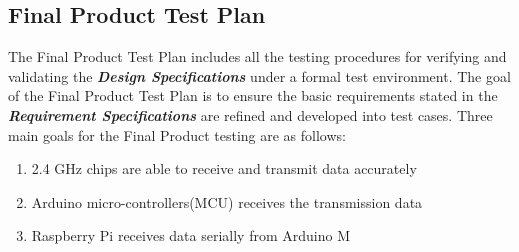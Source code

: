 \pagebreak
\subsection{Final Product Test Plan}
\medskip
The Final Product Test Plan includes all the testing procedures for verifying and validating the \textbf{\textit{Design Specifications}} under a formal
 test environment. The goal of the Final Product Test Plan is to ensure the basic requirements stated in the \textbf{\textit{Requirement Specifications}}
 are refined and developed into test cases. Three main goals for the Final Product testing are as follows:
\begin{enumerate}
    \item 2.4 GHz chips are able to receive and transmit data accurately
    \item Arduino micro-controllers(MCU) receives the transmission data 
    \item Raspberry Pi receives data serially from Arduino M
\end{enumerate}


